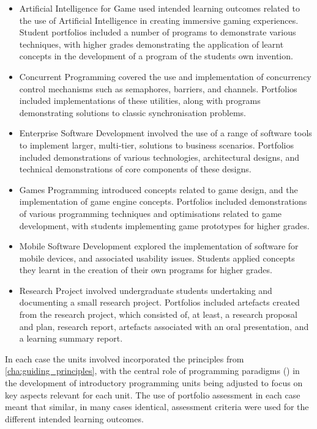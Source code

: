 \begin{itemize}[noitemsep,nolistsep]
	\item Artificial Intelligence for Game used intended learning outcomes related to the use of Artificial Intelligence in creating immersive gaming experiences. Student portfolios included a number of programs to demonstrate various techniques, with higher grades demonstrating the application of learnt concepts in the development of a program of the students own invention.
	\item Concurrent Programming covered the use and implementation of concurrency control mechanisms such as semaphores, barriers, and channels. Portfolios included implementations of these utilities, along with programs demonstrating solutions to classic synchronisation problems.   
	\item Enterprise Software Development involved the use of a range of software tools to implement larger, multi-tier, solutions to business scenarios. Portfolios included demonstrations of various technologies, architectural designs, and technical demonstrations of core components of these designs.
	\item Games Programming introduced concepts related to game design, and the implementation of game engine concepts. Portfolios included demonstrations of various programming techniques and optimisations related to game development, with students implementing game prototypes for higher grades.
	\item Mobile Software Development explored the implementation of software for mobile devices, and associated usability issues. Students applied concepts they learnt in the creation of their own programs for higher grades.
	\item Research Project involved undergraduate students undertaking and documenting a small research project. Portfolios included artefacts created from the research project, which consisted of, at least, a research proposal and plan, research report, artefacts associated with an oral presentation, and a learning summary report. 
\end{itemize}

In each case the units involved incorporated the principles from \cref{cha:guiding_principles}, with the central role of programming paradigms () in the development of introductory programming units being adjusted to focus on key aspects relevant for each unit. The use of portfolio assessment in each case meant that similar, in many cases identical, assessment criteria were used for the different intended learning outcomes.


